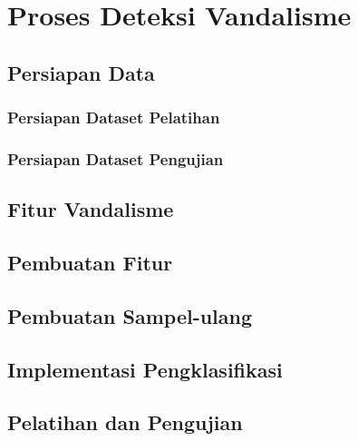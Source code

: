 \chapter{Proses Deteksi Vandalisme}


\section{Persiapan Data}
\label{persiapan_data}


\subsection{Persiapan Dataset Pelatihan}


\subsection{Persiapan Dataset Pengujian}


\section{Fitur Vandalisme}


\section{Pembuatan Fitur}


\section{Pembuatan Sampel-ulang}


\section{Implementasi Pengklasifikasi}


\section{Pelatihan dan Pengujian}


